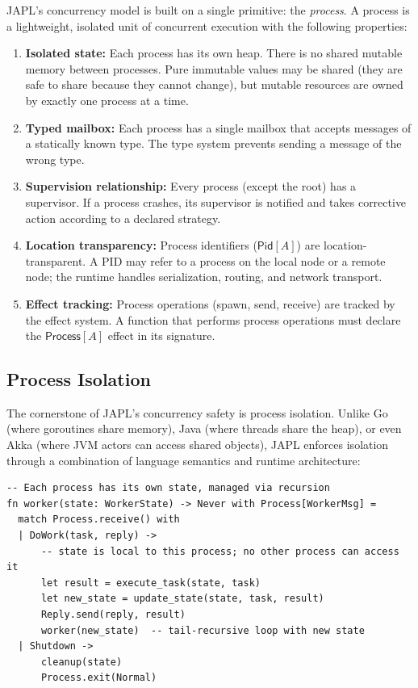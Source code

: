 \documentclass[11pt,a4paper]{article}
\newcommand{\Pid}{\mathsf{Pid}}
\begin{document}
JAPL's concurrency model is built on a single primitive: the \emph{process}. A process is a lightweight, isolated unit of concurrent execution with the following properties:

\begin{enumerate}
\item \textbf{Isolated state:} Each process has its own heap. There is no shared mutable memory between processes. Pure immutable values may be shared (they are safe to share because they cannot change), but mutable resources are owned by exactly one process at a time.

\item \textbf{Typed mailbox:} Each process has a single mailbox that accepts messages of a statically known type. The type system prevents sending a message of the wrong type.

\item \textbf{Supervision relationship:} Every process (except the root) has a supervisor. If a process crashes, its supervisor is notified and takes corrective action according to a declared strategy.

\item \textbf{Location transparency:} Process identifiers ($\Pid[A]$) are location-transparent. A PID may refer to a process on the local node or a remote node; the runtime handles serialization, routing, and network transport.

\item \textbf{Effect tracking:} Process operations (spawn, send, receive) are tracked by the effect system. A function that performs process operations must declare the $\mathsf{Process}[A]$ effect in its signature.
\end{enumerate}

\subsection{Process Isolation}

The cornerstone of JAPL's concurrency safety is process isolation. Unlike Go (where goroutines share memory), Java (where threads share the heap), or even Akka (where JVM actors can access shared objects), JAPL enforces isolation through a combination of language semantics and runtime architecture:

\begin{lstlisting}[language=japl,caption={Process isolation: no shared mutable state}]
-- Each process has its own state, managed via recursion
fn worker(state: WorkerState) -> Never with Process[WorkerMsg] =
  match Process.receive() with
  | DoWork(task, reply) ->
      -- state is local to this process; no other process can access it
      let result = execute_task(state, task)
      let new_state = update_state(state, task, result)
      Reply.send(reply, result)
      worker(new_state)  -- tail-recursive loop with new state
  | Shutdown ->
      cleanup(state)
      Process.exit(Normal)
\end{lstlisting}
\end{document}
